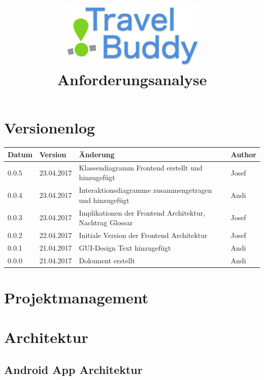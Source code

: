 \documentclass[a4paper,10pt,xetex]{article}
\title{
  \includegraphics[width=7cm]{travel-buddy_white}\\[\bigskipamount]
  Anforderungsanalyse\\[\bigskipamount]
}
\author{\documentauthors}
\date{\parbox{\linewidth}{\centering%
  IT15TA ZH \hspace*{3cm} Gruppe 3\endgraf\bigskip
  \documentdate\endgraf
}}
\begin{document}
\maketitle\newpage

{
\hypersetup{linkcolor=black}
\setcounter{tocdepth}{3}
\tableofcontents
}

\newpage

\section{Versionenlog}\label{versionenlog}

\tabulinesep=1.2mm

\begin{longtabu} to \textwidth { | l | l | X[l] | l | }
  \hline
  \textbf{Datum} & \textbf{Version} & \textbf{Änderung} & \textbf{Author} \\
  \hline
  \endhead

  0.0.5 & 23.04.2017 & Klassendiagramm Frontend erstellt und hinzugefügt & Josef \\
  \hline

  0.0.4 & 23.04.2017 & Interaktionsdiagramme zusammengetragen und hinzugefügt & Andi \\
  \hline

  0.0.3 & 23.04.2017 & Implikationen der Frontend Architektur, Nachtrag Glossar & Josef \\
  \hline

  0.0.2 & 22.04.2017 & Initiale Version der Frontend Architektur & Josef \\
  \hline

  0.0.1 & 21.04.2017 & GUI-Design Text hinzugefügt & Andi\\
  \hline

  0.0.0 & 21.04.2017 & Dokument erstellt & Andi\\
  \hline
\end{longtabu}
\newpage

\section{Projektmanagement}\label{projektmanagement}
\section{Architektur}\label{architektur}
\subsection{Android App Architektur}\label{androidapparchitektur}
\end{document}
